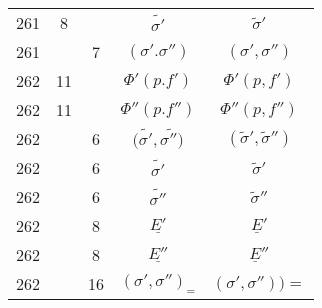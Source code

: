 \documentclass[a4paper,11pt]{article}
\begin{document}
\begin{center}
\begin{tabular}{|c|c|c|c|c|}
    261 & \hphantom{0}8 & & $\widetilde{ \sigma' }$ & $\widetilde{ \sigma }'$ \\
    261 & & \hphantom{0}7 & $( \sigma'. \sigma'' )$ & $( \sigma', \sigma'' )$ \\
    262 & 11 & & $\Phi'( p. f' )$ & $\Phi'( p, f' )$ \\
    262 & 11 & & $\Phi''( p. f'' )$ & $\Phi''( p, f'' )$ \\
    262 & & \hphantom{0}6 & $( \widetilde{ \sigma' }, \widetilde{ \sigma'' ) }$
    & $( \widetilde{ \sigma }', \widetilde{ \sigma }'' )$ \\
    262 & & \hphantom{0}6 & $\widetilde{ \sigma' }$ & $\widetilde{ \sigma }'$ \\
    262 & & \hphantom{0}6 & $\widetilde{ \sigma'' }$ & $\widetilde{ \sigma }''$ \\
    262 & & \hphantom{0}8 & $\underline{ E' }$ & $\underline{ E }'$ \\
    262 & & \hphantom{0}8 & $\underline{ E'' }$ & $\underline{ E }''$ \\
    262 & & 16 & $( \sigma', \sigma'' )_{ = }$
           & $( \sigma', \sigma'' ) \big) =$ \\
    \hline
  \end{tabular}





  \newpage


\end{center}
\end{document}
